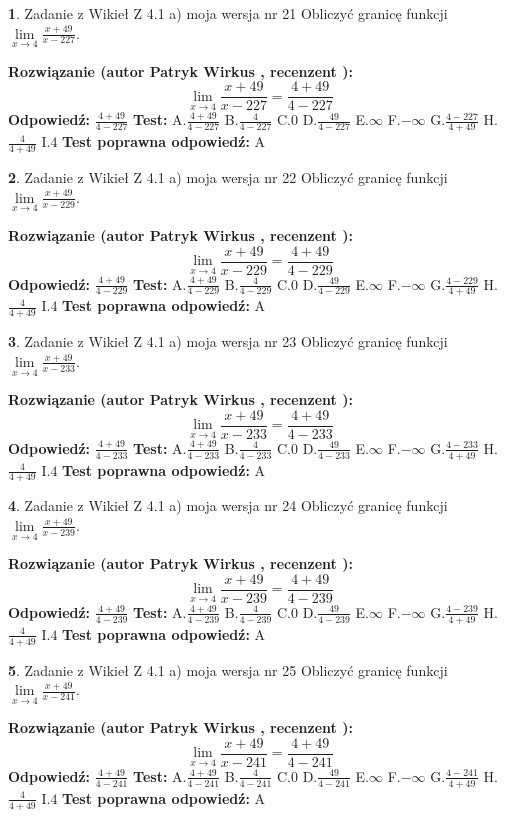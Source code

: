 \documentclass[12pt, a4paper]{article}
\theoremstyle{definition} %
\newtheorem{zad}{}
\newcommand{\zadStart}[1]{\begin{zad}#1\newline}
\newcommand{\zadStop}{\end{zad}}
\newcommand{\rozwStart}[2]{\noindent \textbf{Rozwiązanie (autor #1 , recenzent #2): }\newline}
\newcommand{\rozwStop}{\newline}
\newcommand{\odpStart}{\noindent \textbf{Odpowiedź:}\newline}
\newcommand{\odpStop}{\newline}
\newcommand{\testStart}{\noindent \textbf{Test:}\newline}
\newcommand{\testStop}{\newline}
\newcommand{\kluczStart}{\noindent \textbf{Test poprawna odpowiedź:}\newline}
\newcommand{\kluczStop}{\newline}
\begin{document}
\zadStart{Zadanie z Wikieł Z 4.1 a) moja wersja nr 21}
Obliczyć granicę funkcji $\lim\limits_{x\to4}\frac{x+49}{x-227}$.
\zadStop
\rozwStart{Patryk Wirkus}{}
$$\lim\limits_{x\to4}\frac{x+49}{x-227} = \frac{4+49}{4-227}$$
\rozwStop
\odpStart
$\frac{4+49}{4-227}$
\odpStop
\testStart
A.$\frac{4+49}{4-227}$
B.$\frac{4}{4-227}$
C.$0$
D.$\frac{49}{4-227}$
E.$\infty$
F.$-\infty$
G.$\frac{4-227}{4+49}$
H.$\frac{4}{4+49}$
I.$4$
\testStop
\kluczStart
A
\kluczStop



\zadStart{Zadanie z Wikieł Z 4.1 a) moja wersja nr 22}
Obliczyć granicę funkcji $\lim\limits_{x\to4}\frac{x+49}{x-229}$.
\zadStop
\rozwStart{Patryk Wirkus}{}
$$\lim\limits_{x\to4}\frac{x+49}{x-229} = \frac{4+49}{4-229}$$
\rozwStop
\odpStart
$\frac{4+49}{4-229}$
\odpStop
\testStart
A.$\frac{4+49}{4-229}$
B.$\frac{4}{4-229}$
C.$0$
D.$\frac{49}{4-229}$
E.$\infty$
F.$-\infty$
G.$\frac{4-229}{4+49}$
H.$\frac{4}{4+49}$
I.$4$
\testStop
\kluczStart
A
\kluczStop



\zadStart{Zadanie z Wikieł Z 4.1 a) moja wersja nr 23}
Obliczyć granicę funkcji $\lim\limits_{x\to4}\frac{x+49}{x-233}$.
\zadStop
\rozwStart{Patryk Wirkus}{}
$$\lim\limits_{x\to4}\frac{x+49}{x-233} = \frac{4+49}{4-233}$$
\rozwStop
\odpStart
$\frac{4+49}{4-233}$
\odpStop
\testStart
A.$\frac{4+49}{4-233}$
B.$\frac{4}{4-233}$
C.$0$
D.$\frac{49}{4-233}$
E.$\infty$
F.$-\infty$
G.$\frac{4-233}{4+49}$
H.$\frac{4}{4+49}$
I.$4$
\testStop
\kluczStart
A
\kluczStop



\zadStart{Zadanie z Wikieł Z 4.1 a) moja wersja nr 24}
Obliczyć granicę funkcji $\lim\limits_{x\to4}\frac{x+49}{x-239}$.
\zadStop
\rozwStart{Patryk Wirkus}{}
$$\lim\limits_{x\to4}\frac{x+49}{x-239} = \frac{4+49}{4-239}$$
\rozwStop
\odpStart
$\frac{4+49}{4-239}$
\odpStop
\testStart
A.$\frac{4+49}{4-239}$
B.$\frac{4}{4-239}$
C.$0$
D.$\frac{49}{4-239}$
E.$\infty$
F.$-\infty$
G.$\frac{4-239}{4+49}$
H.$\frac{4}{4+49}$
I.$4$
\testStop
\kluczStart
A
\kluczStop



\zadStart{Zadanie z Wikieł Z 4.1 a) moja wersja nr 25}
Obliczyć granicę funkcji $\lim\limits_{x\to4}\frac{x+49}{x-241}$.
\zadStop
\rozwStart{Patryk Wirkus}{}
$$\lim\limits_{x\to4}\frac{x+49}{x-241} = \frac{4+49}{4-241}$$
\rozwStop
\odpStart
$\frac{4+49}{4-241}$
\odpStop
\testStart
A.$\frac{4+49}{4-241}$
B.$\frac{4}{4-241}$
C.$0$
D.$\frac{49}{4-241}$
E.$\infty$
F.$-\infty$
G.$\frac{4-241}{4+49}$
H.$\frac{4}{4+49}$
I.$4$
\testStop
\kluczStart
A
\kluczStop
\end{document}
